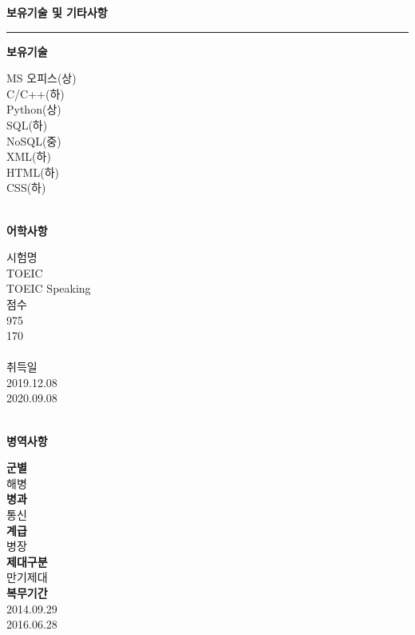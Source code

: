 \documentclass{resume} %
\begin{document}
{\bf \MakeUppercase {보유기술 및 기타사항} %
  \sectionlineskip
  \hrule
  }
\begin{multicols}{3}
{\bf 보유기술}
\setlength{\columnseprule}{0.4pt}
\begin{multicols}{2}
MS 오피스(상)\\ C/C++(하)\\
Python(상)\\SQL(하)\\NoSQL(중)\\XML(하)\\ HTML(하)\\CSS(하)
\end{multicols}
\\{\bf 어학사항}
\begin{multicols}{3}
시험명
\\ TOEIC
\\ TOEIC Speaking
\\ 점수
\\975 
\\170
\\
\\취득일
\\2019.12.08
\\2020.09.08
\end{multicols}
\\{\bf 병역사항}
\begin{multicols}{3}
{\bf 군별}
\\해병
\\{\bf 병과}
\\통신
\\{\bf 계급}
\\병장
\\{\bf 제대구분}
\\만기제대
\\{\bf 복무기간}
\\2014.09.29 \\ 2016.06.28
\end{multicols}

\end{multicols}{}
\end{document}
